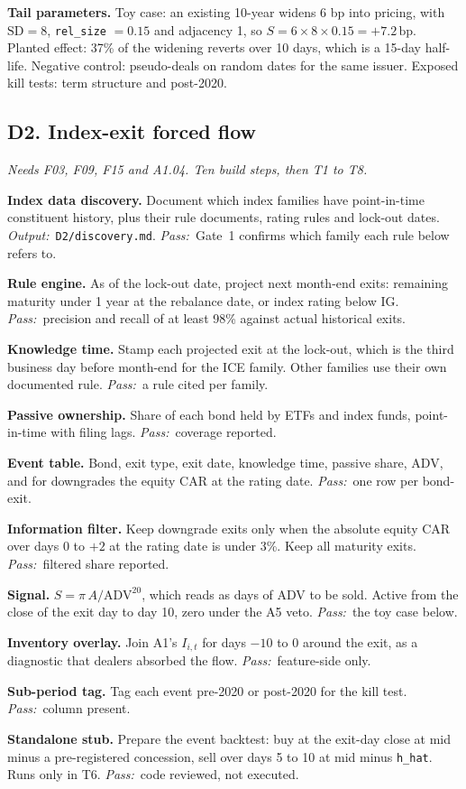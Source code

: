 \documentclass[11pt,letterpaper]{article}
\makeatletter
\newcommand{\code}[1]{\texttt{#1}}
\newcommand{\bp}{\,\mathrm{bp}}
\newcommand{\ADV}{\mathrm{ADV}}
\newcommand{\SD}{\mathrm{SD}}             %
\newcommand*{\twodigit}[1]{\expandafter\@twodigit\csname c@#1\endcsname}
\newcommand*{\@twodigit}[1]{\ifnum#1<10 0\fi\number#1}
\newcommand{\stepname}[1]{\textbf{#1.}}
\newcommand{\Out}{\textit{Output:}~}
\newcommand{\Pass}{\textit{Pass:}~}
\makeatother
\begin{document}
\textbf{Tail parameters.} Toy case: an existing 10-year widens 6 bp into pricing, with $\SD=8$, \code{rel_size} $=0.15$ and adjacency 1, so $S=6\times8\times0.15=+7.2\bp$. Planted effect: 37\% of the widening reverts over 10 days, which is a 15-day half-life. Negative control: pseudo-deals on random dates for the same issuer. Exposed kill tests: term structure and post-2020.

\subsection{D2. Index-exit forced flow}
\emph{Needs F03, F09, F15 and A1.04. Ten build steps, then T1 to T8.}
\begin{ladder}[label=\textbf{D2.\twodigit*}]
\item \stepname{Index data discovery} Document which index families have point-in-time constituent history, plus their rule documents, rating rules and lock-out dates. \Out \code{D2/discovery.md}. \Pass Gate~1 confirms which family each rule below refers to.
\item \stepname{Rule engine} As of the lock-out date, project next month-end exits: remaining maturity under 1 year at the rebalance date, or index rating below IG. \Pass precision and recall of at least 98\% against actual historical exits.
\item \stepname{Knowledge time} Stamp each projected exit at the lock-out, which is the third business day before month-end for the ICE family. Other families use their own documented rule. \Pass a rule cited per family.
\item \stepname{Passive ownership} Share of each bond held by ETFs and index funds, point-in-time with filing lags. \Pass coverage reported.
\item \stepname{Event table} Bond, exit type, exit date, knowledge time, passive share, ADV, and for downgrades the equity CAR at the rating date. \Pass one row per bond-exit.
\item \stepname{Information filter} Keep downgrade exits only when the absolute equity CAR over days 0 to $+2$ at the rating date is under 3\%. Keep all maturity exits. \Pass filtered share reported.
\item \stepname{Signal} $S=\pi\,A/\ADV^{20}$, which reads as days of ADV to be sold. Active from the close of the exit day to day 10, zero under the A5 veto. \Pass the toy case below.
\item \stepname{Inventory overlay} Join A1's $I_{i,t}$ for days $-10$ to 0 around the exit, as a diagnostic that dealers absorbed the flow. \Pass feature-side only.
\item \stepname{Sub-period tag} Tag each event pre-2020 or post-2020 for the kill test. \Pass column present.
\item \stepname{Standalone stub} Prepare the event backtest: buy at the exit-day close at mid minus a pre-registered concession, sell over days 5 to 10 at mid minus \code{h_hat}. Runs only in T6. \Pass code reviewed, not executed.
\end{ladder}
\end{document}
